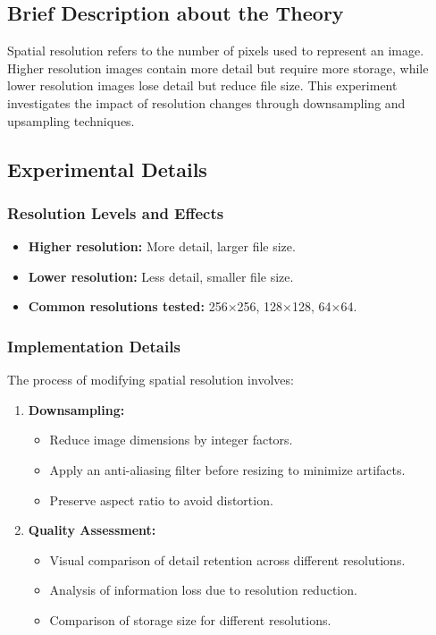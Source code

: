 \documentclass[12pt,a4paper]{article}
\begin{document}
\subsection{Brief Description about the Theory}
Spatial resolution refers to the number of pixels used to represent an image. Higher resolution images contain more detail but require more storage, while lower resolution images lose detail but reduce file size. This experiment investigates the impact of resolution changes through downsampling and upsampling techniques.

\subsection{Experimental Details}
\subsubsection{Resolution Levels and Effects}
\begin{itemize}
  \item \textbf{Higher resolution:} More detail, larger file size.
  \item \textbf{Lower resolution:} Less detail, smaller file size.
  \item \textbf{Common resolutions tested:} 256×256, 128×128, 64×64.
\end{itemize}

\subsubsection{Implementation Details}
The process of modifying spatial resolution involves:

\begin{enumerate}
  \item \textbf{Downsampling:}
    \begin{itemize}
      \item Reduce image dimensions by integer factors.
      \item Apply an anti-aliasing filter before resizing to minimize artifacts.
      \item Preserve aspect ratio to avoid distortion.
    \end{itemize}

  \item \textbf{Quality Assessment:}
    \begin{itemize}
      \item Visual comparison of detail retention across different resolutions.
      \item Analysis of information loss due to resolution reduction.
      \item Comparison of storage size for different resolutions.
    \end{itemize}
\end{enumerate}
\end{document}
